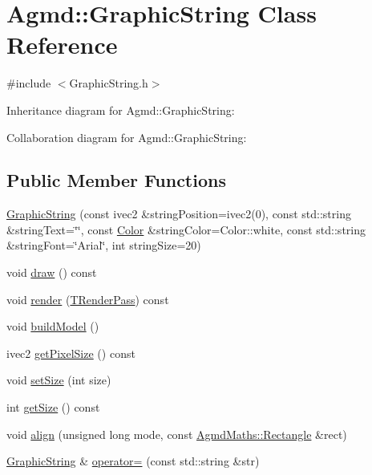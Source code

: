 \hypertarget{class_agmd_1_1_graphic_string}{\section{Agmd\+:\+:Graphic\+String Class Reference}
\label{class_agmd_1_1_graphic_string}
}


{\ttfamily \#include $<$Graphic\+String.\+h$>$}



Inheritance diagram for Agmd\+:\+:Graphic\+String\+:


Collaboration diagram for Agmd\+:\+:Graphic\+String\+:
\subsection*{Public Member Functions}
\begin{DoxyCompactItemize}
\item 
\hyperlink{class_agmd_1_1_graphic_string_a207dacb7edd1f65eaf283f16fc6f9873}{Graphic\+String} (const ivec2 \&string\+Position=ivec2(0), const std\+::string \&string\+Text=\char`\"{}\char`\"{}, const \hyperlink{class_agmd_utilities_1_1_color}{Color} \&string\+Color=Color\+::white, const std\+::string \&string\+Font=\char`\"{}Arial\char`\"{}, int string\+Size=20)
\item 
void \hyperlink{class_agmd_1_1_graphic_string_ab9d50266a34661bbf588d70b4b544ffa}{draw} () const 
\item 
void \hyperlink{class_agmd_1_1_graphic_string_a5dca6135a6e1b44a49ebe05e594bf1ed}{render} (\hyperlink{namespace_agmd_a893087981df53d0bf39466e9039aeb73}{T\+Render\+Pass}) const 
\item 
void \hyperlink{class_agmd_1_1_graphic_string_a49a622873a0db2884bf3559aa2d53018}{build\+Model} ()
\item 
ivec2 \hyperlink{class_agmd_1_1_graphic_string_aed7341e03f4993d89eb9684f03c910e3}{get\+Pixel\+Size} () const 
\item 
void \hyperlink{class_agmd_1_1_graphic_string_a0b5437cb0a60050e2238920bf73e6a06}{set\+Size} (int size)
\item 
int \hyperlink{class_agmd_1_1_graphic_string_a148a33e1076649d355619138a7fd2ac3}{get\+Size} () const 
\item 
void \hyperlink{class_agmd_1_1_graphic_string_af80769f95356e9efe0982171fc6fae55}{align} (unsigned long mode, const \hyperlink{class_agmd_maths_1_1_rectangle}{Agmd\+Maths\+::\+Rectangle} \&rect)
\item 
\hyperlink{class_agmd_1_1_graphic_string}{Graphic\+String} \& \hyperlink{class_agmd_1_1_graphic_string_aadc63a23f40a9a17a66a961a6d84e88e}{operator=} (const std\+::string \&str)
\end{DoxyCompactItemize}
